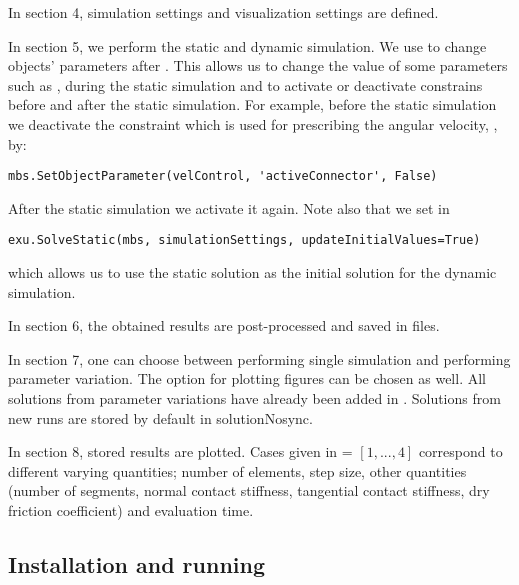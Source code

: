 \ei
\item{In section 4, simulation settings and visualization settings are defined.}
\item{In section 5, we perform the static and dynamic simulation. %
We use  to change objects' parameters after . This allows us to change the value of some parameters such as ,  during the static simulation and to activate or deactivate constrains before and after the static simulation.
For example, before the static simulation we deactivate the constraint which is used for prescribing the angular velocity, , by:
\pythonstyle
\begin{lstlisting}
mbs.SetObjectParameter(velControl, 'activeConnector', False)
\end{lstlisting} 
After the static simulation we activate it again.
Note also that we set  in 
\pythonstyle
\begin{lstlisting}
exu.SolveStatic(mbs, simulationSettings, updateInitialValues=True) 
\end{lstlisting}
which allows us to use the static solution as the initial solution for the dynamic simulation.}
\item{In section 6, the obtained results are post-processed and saved in files.}
\item{In section 7, one can choose between performing single simulation and performing parameter variation.
The option for plotting figures can be chosen as well. All solutions from parameter variations have already been added in . Solutions from new runs are stored by default in solutionNosync.} %
\item{In section 8, stored results are plotted. Cases given in  = $[1,..., 4]$ correspond to different varying quantities; number of elements, step size, other quantities (number of segments, normal contact stiffness, tangential contact stiffness, dry friction coefficient) and evaluation time.}
%

\ei
\subsection{Installation and running}
